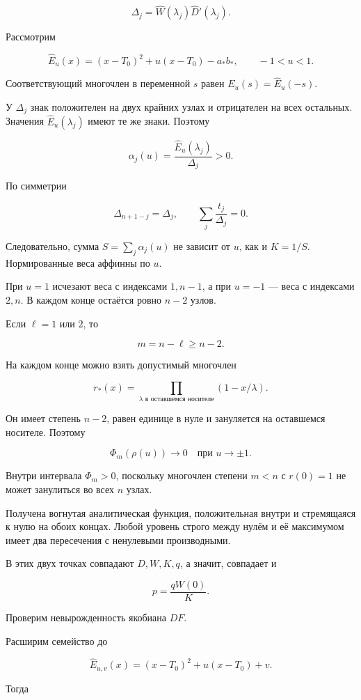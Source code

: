 \documentclass[11pt,a4paper]{article}
\begin{document}
\[
\Delta_j=\widehat W(\lambda_j)\widehat D'(\lambda_j).
\]

Рассмотрим

\[
\widehat E_u(x)
=(x-T_0)^2+u(x-T_0)-a_*b_*,
\qquad -1<u<1.
\]

Соответствующий многочлен в переменной \(s\) равен \(E_u(s)=\widehat E_u(-s)\).

У \(\Delta_j\) знак положителен на двух крайних узлах и отрицателен на всех остальных. Значения \(\widehat E_u(\lambda_j)\) имеют те же знаки. Поэтому

\[
\alpha_j(u)=\frac{\widehat E_u(\lambda_j)}{\Delta_j}>0.
\]

По симметрии

\[
\Delta_{n+1-j}=\Delta_j,\qquad
\sum_j\frac{t_j}{\Delta_j}=0.
\]

Следовательно, сумма \(S=\sum_j\alpha_j(u)\) не зависит от \(u\), как и \(K=1/S\). Нормированные веса аффинны по \(u\).

При \(u=1\) исчезают веса с индексами \(1,n-1\), а при \(u=-1\) — веса с индексами \(2,n\). В каждом конце остаётся ровно \(n-2\) узлов.

Если \(\ell=1\) или \(2\), то

\[
m=n-\ell\ge n-2.
\]

На каждом конце можно взять допустимый многочлен

\[
r_*(x)=
\prod_{\lambda\text{ в оставшемся носителе}}
(1-x/\lambda).
\]

Он имеет степень \(n-2\), равен единице в нуле и зануляется на оставшемся носителе. Поэтому

\[
\Phi_m(\rho(u))\longrightarrow0
\quad\text{при }u\to\pm1.
\]

Внутри интервала \(\Phi_m>0\), поскольку многочлен степени \(m<n\) с \(r(0)=1\) не может занулиться во всех \(n\) узлах.

Получена вогнутая аналитическая функция, положительная внутри и стремящаяся к нулю на обоих концах. Любой уровень строго между нулём и её максимумом имеет два пересечения с ненулевыми производными.

В этих двух точках совпадают \(D,W,K,q\), а значит, совпадает и

\[
p=\frac{qW(0)}K.
\]

Проверим невырожденность якобиана \(DF\).

Расширим семейство до

\[
\widehat E_{u,v}(x)
=(x-T_0)^2+u(x-T_0)+v.
\]

Тогда
\end{document}
